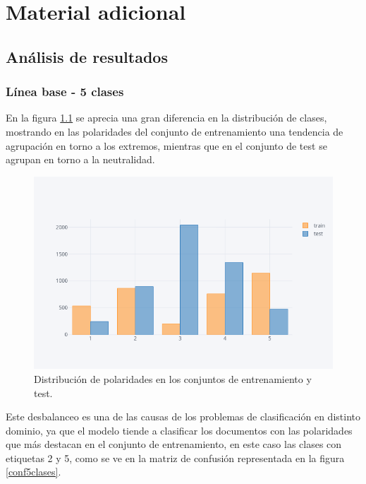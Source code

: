 \chapter{Material adicional}
\label{chap:adicional}

\section {Análisis de resultados}

\subsection{Línea base - 5 clases}\label{analisis_bl_5}

En la figura \ref{distTassCine} se aprecia una gran diferencia en la distribución de clases, mostrando en las polaridades del conjunto de entrenamiento una tendencia de agrupación en torno a los extremos, mientras que en el conjunto de test se agrupan en torno a la neutralidad. 

\begin{figure}[H]
	\centering
	\includegraphics[width=1\textwidth]{imaxes/distCineTass.png}
	\caption{Distribución de polaridades en los conjuntos de entrenamiento y test.}
	\label{distTassCine}
\end{figure}

Este desbalanceo es una de las causas de los problemas de clasificación en distinto dominio, ya que el modelo tiende a clasificar los documentos con las polaridades que más destacan en el conjunto de entrenamiento, en este caso las clases con etiquetas 2 y 5, como se ve en la matriz de confusión representada en la figura \ref{conf5clases}.



